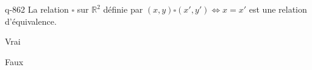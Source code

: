 \begin{truefalse}{q-862}
La relation $\square$ sur $\mathbb R^2$ définie par $(x,y)\square (x',y') \iff x=x'$ est une relation d'équivalence.
\item* Vrai
\item Faux
\end{truefalse}

